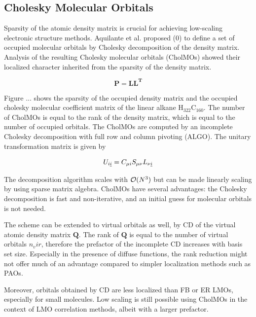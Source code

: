 
\subsection{Cholesky Molecular Orbitals}

Sparsity of the atomic density matrix is crucial for achieving low-scaling electronic structure methods. Aquilante et al. proposed (0) to define a set of occupied molecular orbitals by Cholesky decomposition of the density matrix. Analysis of the resulting Cholesky molecular orbitals (CholMOs) showed their localized character inherited from the sparsity of the density matrix.

\begin{equation}
\mathbf{P} = \mathbf{LL^T}
\end{equation}

Figure ... shows the sparsity of the occupied density matrix and the occupied cholesky molecular coefficient matrix of the linear alkane H$_{322}$C$_{160}$. The number of CholMOs is equal to the rank of the density matrix, which is equal to the number of occupied orbitals. The CholMOs are computed by an incomplete Cholesky decomposition with full row and column pivoting  (ALGO). The unitary transformation matrix is given by

\begin{equation}
U_{i\underline{i}} = C_{\mu i} S_{\mu \nu} L_{\nu \underline{i}}
\end{equation}

The decomposition algorithm scales with $\mathcal{O}(N^{3})$ but can be made linearly scaling by using sparse matrix algebra. CholMOs have several advantages: the Cholesky decomposition is fast and non-iterative, and an initial guess for molecular orbitals is not needed. 

The scheme can be extended to virtual orbitals as well, by CD of the virtual atomic density matrix $\mathbf{Q}$. The rank of $\mathbf{Q}$ is equal to the number of virtual orbitals $n_vir$, therefore the prefactor of the incomplete CD increases with basis set size. Especially in the presence of diffuse functions, the rank reduction might not offer much of an advantage compared to simpler localization methods such as PAOs.  

Moreover, orbitals obtained by CD are less localized than FB or ER LMOs, especially for small molecules. Low scaling is still possible using CholMOs in the context of LMO correlation methods, albeit with a larger prefactor.

